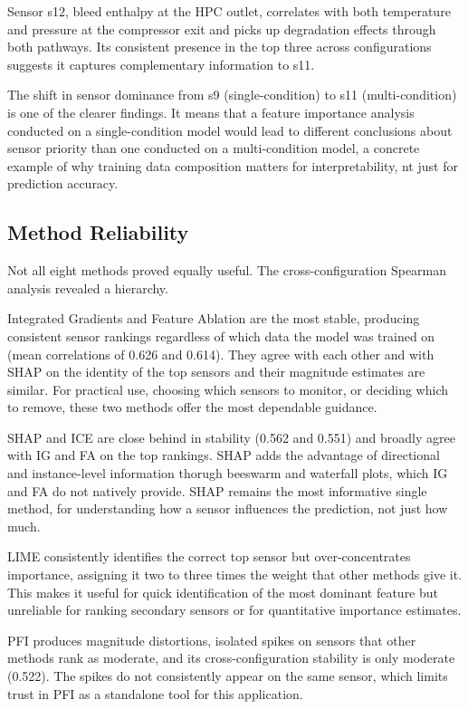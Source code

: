 Sensor s12, bleed enthalpy at the HPC outlet, correlates with both temperature and pressure at the compressor exit and picks up degradation effects through both pathways. Its consistent presence in the top three across configurations suggests it captures complementary information to s11.

The shift in sensor dominance from s9 (single-condition) to s11 (multi-condition) is one of the clearer findings. It means that a feature importance analysis conducted on a single-condition model would lead to different conclusions about sensor priority than one conducted on a multi-condition model, a concrete example of why training data composition matters for interpretability, nt just for prediction accuracy.

\subsection{Method Reliability}
Not all eight methods proved equally useful. The cross-configuration Spearman analysis revealed a hierarchy.

Integrated Gradients and Feature Ablation are the most stable, producing consistent sensor rankings regardless of which data the model was trained on (mean correlations of 0.626 and 0.614). They agree with each other and with SHAP on the identity of the top sensors and their magnitude estimates are similar. For practical use, choosing which sensors to monitor, or deciding which to remove, these two methods offer the most dependable guidance.

SHAP and ICE are close behind in stability (0.562 and 0.551) and broadly agree with IG and FA on the top rankings. SHAP adds the advantage of directional and instance-level information thorugh beeswarm and waterfall plots, which IG and FA do not natively provide. SHAP remains the most informative single method, for understanding how a sensor influences the prediction, not just how much.

LIME consistently identifies the correct top sensor but over-concentrates importance, assigning it two to three times the weight that other methods give it. This makes it useful for quick identification of the most dominant feature but unreliable for ranking secondary sensors or for quantitative importance estimates. 

PFI produces magnitude distortions, isolated spikes on sensors that other methods rank as moderate, and its cross-configuration stability is only moderate (0.522). The spikes do not consistently appear on the same sensor, which limits trust in PFI as a standalone tool for this application.

